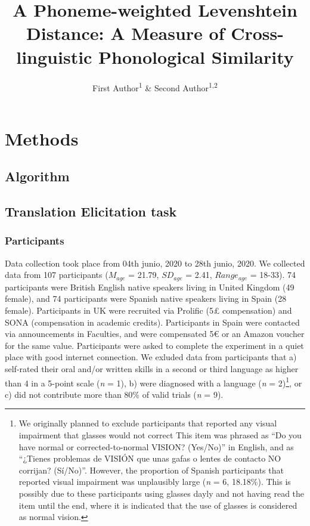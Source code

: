 \documentclass[
  english,
  man]{apa6}
\title{A Phoneme-weighted Levenshtein Distance: A Measure of Cross-linguistic Phonological Similarity}
\author{First Author\textsuperscript{1} \& Second Author\textsuperscript{1,2}}
\date{}
\affiliation{\phantom{0}}
\begin{document}
\maketitle

\hypertarget{methods}{%
\section{Methods}\label{methods}}

\hypertarget{algorithm}{%
\subsection{Algorithm}\label{algorithm}}

\hypertarget{translation-elicitation-task}{%
\subsection{Translation Elicitation task}\label{translation-elicitation-task}}

\hypertarget{participants}{%
\subsubsection{Participants}\label{participants}}

Data collection took place from 04th junio, 2020 to 28th junio, 2020. We collected data from 107 participants (\(M_{age}\) = 21.79, \(SD_{age}\) = 2.41, \(Range_{age}\) = 18-33). 74 participants were British English native speakers living in United Kingdom (49 female), and 74 participants were Spanish native speakers living in Spain (28 female). Participants in UK were recruited via Prolific (5£ compensation) and SONA (compensation in academic credits). Participants in Spain were contacted via announcements in Faculties, and were compensated 5€ or an Amazon voucher for the same value. Participants were asked to complete the experiment in a quiet place with good internet connection. We exluded data from participants that a) self-rated their oral and/or written skills in a second or third language as higher than 4 in a 5-point scale (\emph{n} = 1), b) were diagnosed with a language (\emph{n} = 2)\footnote{We originally planned to exclude participants that reported any visual impairment that glasses would not correct This item was phrased as \enquote{Do you have normal or corrected-to-normal VISION? (Yes/No)} in English, and as \enquote{¿Tienes problemas de VISIÓN que unas gafas o lentes de contacto NO corrijan? (Sí/No)}. However, the proportion of Spanish participants that reported visual impairment was unplausibly large (\emph{n} = 6, 18.18\%). This is possibly due to these participants using glasses dayly and not having read the item until the end, where it is indicated that the use of glasses is considered as normal vision.}, or c) did not contribute more than 80\% of valid trials (\emph{n} = 9).
\end{document}
